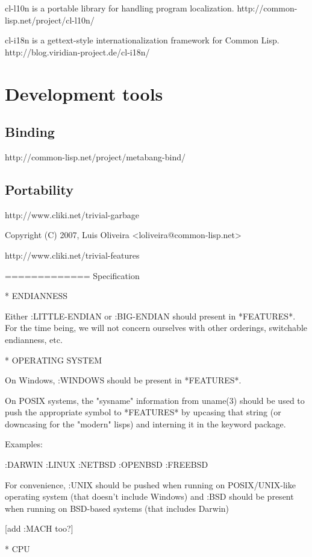\documentclass[10pt,english]{book}
\begin{document}
cl-l10n is a portable library for handling program localization.
http://common-lisp.net/project/cl-l10n/

cl-i18n is a gettext-style internationalization framework for Common
Lisp.
http://blog.viridian-project.de/cl-i18n/


\chapter{Development tools}
\label{cha:development-tools}

\section{Binding}
\label{sec:binding}

http://common-lisp.net/project/metabang-bind/

\section{Portability}
\label{sec:portability}

http://www.cliki.net/trivial-garbage

Copyright (C) 2007, Luis Oliveira  <loliveira@common-lisp.net>

http://www.cliki.net/trivial-features

=============
Specification

* ENDIANNESS

Either :LITTLE-ENDIAN or :BIG-ENDIAN should present in *FEATURES*.
For the time being, we will not concern ourselves with other
orderings, switchable endianness, etc.


* OPERATING SYSTEM

On Windows, :WINDOWS should be present in *FEATURES*.

On POSIX systems, the "sysname" information from uname(3) should be
used to push the appropriate symbol to *FEATURES* by upcasing that
string (or downcasing for the "modern" lisps) and interning it in the
keyword package.

Examples:

  :DARWIN
  :LINUX
  :NETBSD
  :OPENBSD
  :FREEBSD

For convenience, :UNIX should be pushed when running on
POSIX/UNIX-like operating system (that doesn't include Windows) and
:BSD should be present when running on BSD-based systems (that
includes Darwin)

[add :MACH too?]


* CPU
\end{document}
